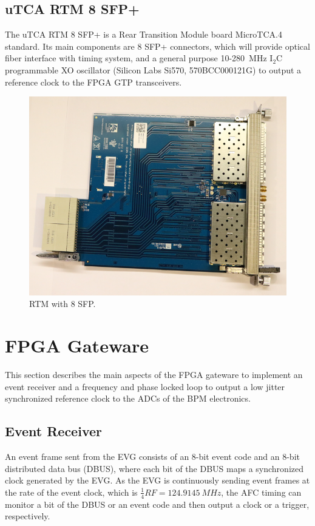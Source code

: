 \documentclass[a4paper,
               biblatex,      %
               ]{jacow}
\begin{document}
\subsection{uTCA RTM 8 SFP+}
The uTCA RTM 8 SFP+ \cite{rtm-sfp-git} is a Rear Transition Module board MicroTCA.4 standard. Its main components are 8 SFP+ connectors, which will provide optical fiber interface with timing system, and a general purpose 10-280~MHz I$_{2}$C programmable XO oscillator (Silicon Labs Si570, 570BCC000121G) to output a reference clock to the FPGA GTP transceivers. 

\begin{figure}[!htb]
   \centering
   \includegraphics*[width=0.8\columnwidth]{RTM_SFP_resized}
   \caption{RTM with 8 SFP.}
   \label{fig:rtm_sfp}
\end{figure}

\section{FPGA Gateware}

This section describes the main aspects of the FPGA gateware to implement an event receiver and a frequency and phase locked loop to output a low jitter synchronized reference clock to the ADCs of the BPM electronics.

\subsection{Event Receiver}

An event frame sent from the EVG consists of an 8-bit event code and an 8-bit distributed data bus (DBUS), where each bit of the DBUS maps a synchronized clock generated by the EVG.
As the EVG is continuously sending event frames at the rate of the event clock, which is $\frac{1}{4}RF=124.9145~MHz$, the AFC timing can monitor a bit of the DBUS or an event code and then output a clock or a trigger, respectively. 
\end{document}
